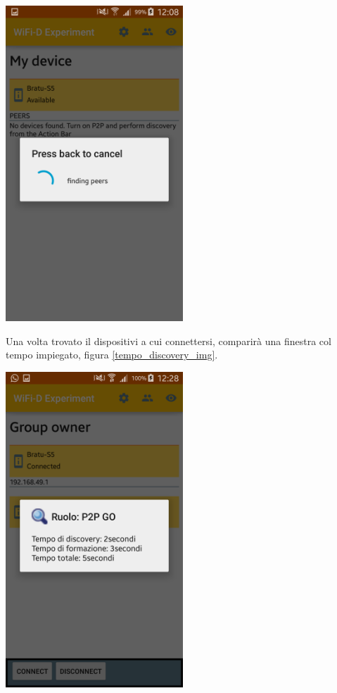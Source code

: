\begin{center}
\includegraphics[width=0.5\textwidth]{imgs/Discovery.png}
\label{discovery_img}%
\end{center}

Una volta trovato il dispositivi a cui connettersi, comparirà una finestra col tempo impiegato, figura \ref{tempo_discovery_img}.

\begin{center}
\includegraphics[width=0.5\textwidth]{imgs/tempo_discovery.png}
\label{tempo_discovery_img}%
\end{center}


